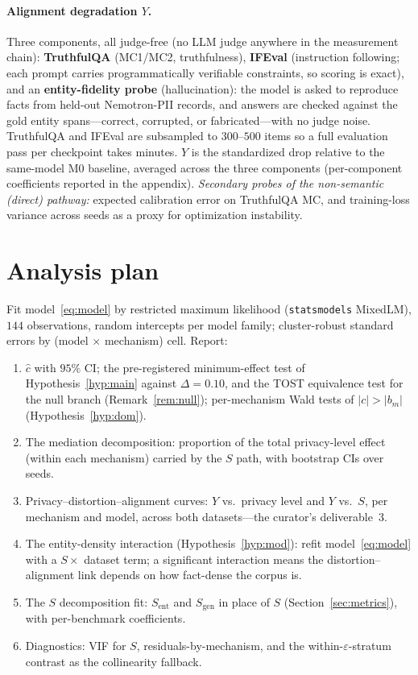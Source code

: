 \documentclass{article}
\theoremstyle{definition}
\theoremstyle{plain}
\theoremstyle{remark}
\newcommand{\eps}{\varepsilon}
\newcommand{\Sdist}{S}
\newcommand{\seclabel}[1]{\label{sec:#1}}
\newcommand{\secref}[1]{Section~\ref{sec:#1}}
\begin{document}
\paragraph{Alignment degradation $Y$.}
Three components, all judge-free (no LLM judge anywhere in the
measurement chain): \textbf{TruthfulQA} (MC1/MC2, truthfulness),
\textbf{IFEval} (instruction following; each prompt carries programmatically
verifiable constraints, so scoring is exact), and an \textbf{entity-fidelity
probe} (hallucination): the model is asked to reproduce facts from held-out
Nemotron-PII records, and answers are checked against the gold entity
spans---correct, corrupted, or fabricated---with no judge noise. TruthfulQA
and IFEval are subsampled to $300$--$500$ items so a full evaluation pass per
checkpoint takes minutes. $Y$ is the standardized drop relative to the
same-model M0 baseline, averaged across the three components (per-component
coefficients reported in the appendix).
\emph{Secondary probes of the non-semantic (direct) pathway:} expected
calibration error on TruthfulQA MC, and training-loss variance across seeds
as a proxy for optimization instability.

\section{Analysis plan}\seclabel{analysis}
Fit model~\eqref{eq:model} by restricted maximum likelihood
(\texttt{statsmodels} MixedLM), $144$ observations, random intercepts per
model family; cluster-robust standard errors by (model $\times$ mechanism)
cell. Report:
\begin{enumerate}[left=0pt,itemsep=1pt,topsep=1pt]
 \item $\hat c$ with $95\%$ CI; the pre-registered minimum-effect test
 of Hypothesis~\ref{hyp:main} against $\Delta = 0.10$, and the TOST
 equivalence test for the null branch (Remark~\ref{rem:null}); per-mechanism
 Wald tests of $|c| > |b_{m}|$ (Hypothesis~\ref{hyp:dom}).
 \item The mediation decomposition: proportion of the total privacy-level effect
 (within each mechanism) carried by the $\Sdist$ path, with
 bootstrap CIs over seeds.
 \item Privacy--distortion--alignment curves: $Y$ vs.\ privacy level and $Y$ vs.\
 $\Sdist$, per mechanism and model, across both datasets---the
 curator's deliverable~3.
 \item The entity-density interaction (Hypothesis~\ref{hyp:mod}): refit
 model~\eqref{eq:model} with a $\Sdist \times$ dataset term; a
 significant interaction means the distortion--alignment link depends
 on how fact-dense the corpus is.
 \item The $\Sdist$ decomposition fit: $\Sdist_{\mathrm{ent}}$ and
 $\Sdist_{\mathrm{gen}}$ in place of $\Sdist$ (\secref{metrics}),
 with per-benchmark coefficients.
 \item Diagnostics: VIF for $\Sdist$, residuals-by-mechanism, and the
 within-$\eps$-stratum contrast as the collinearity fallback.
\end{enumerate}
\end{document}
